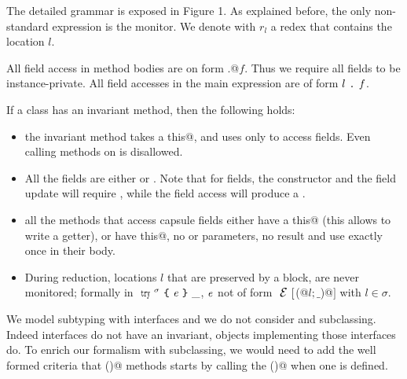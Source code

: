 The detailed grammar is exposed in Figure 1.
As explained before, the only non-standard expression is the monitor.
We denote with $r_l$ a redex that contains the location $l$.

All field access in method bodies are on form
\Q@this.@$f$. Thus we require all fields to be instance-private.
All field accesses in the main expression are of form $l{ \mbox{ {\texttt{.}} } }\mathit{f}$.

\noindent If a class has an invariant method, then the following holds:
\begin{itemize}
\item the invariant method takes a \Q@read this@, and uses \Q@this@ only to access fields. Even calling methods on \Q@this@
is disallowed.
\item All the fields are either \Q@imm@ or \Q@capsule@.
Note that for \Q@capsule@ fields, the constructor and the field update
will require \Q@capsule@, while the field access will produce a \Q@mut@.
\item all the methods that access
capsule fields 
either have a \Q@read this@ (this allows to write a getter),
or have \Q@mut this@, no \Q@mut@ or \Q@read@ parameters, no \Q@mut@ result and 
use \Q@this@ exactly once in their body.
\item 
During reduction, locations $l$ that are preserved by a \Q@try@ block, are
never monitored; formally 
in $\Kw{try}^\sigma\oC\e\cC\_$, ${\mathit{e}}$ not of form $\ctx[$\Q@M(@$l;\_$\Q@)@$]$ with $l\in\sigma$.
\end{itemize}
We model subtyping with interfaces 
and we do not consider \Q@extends@ and subclassing.
Indeed interfaces do not have an invariant, objects implementing those interfaces do.
To enrich our formalism with subclassing, we would need to add the well 
formed criteria that \Q@invariant()@ methods starts by calling the \Q@super@ \Q@invariant()@ when one is defined.
\saveSpace
